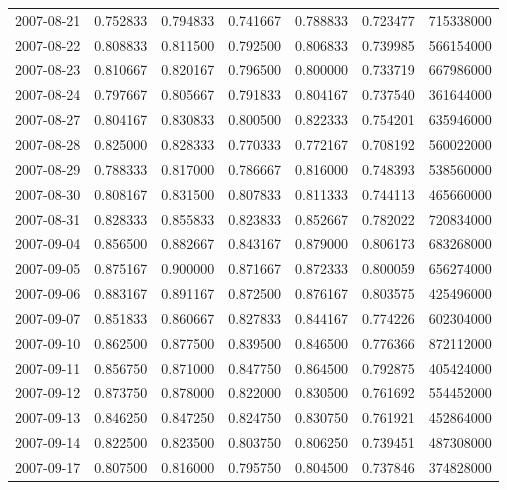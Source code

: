 \begin{tabular}{lrrrrrr}
2007-08-21 &    0.752833 &    0.794833 &    0.741667 &    0.788833 &    0.723477 &   715338000 \\
2007-08-22 &    0.808833 &    0.811500 &    0.792500 &    0.806833 &    0.739985 &   566154000 \\
2007-08-23 &    0.810667 &    0.820167 &    0.796500 &    0.800000 &    0.733719 &   667986000 \\
2007-08-24 &    0.797667 &    0.805667 &    0.791833 &    0.804167 &    0.737540 &   361644000 \\
2007-08-27 &    0.804167 &    0.830833 &    0.800500 &    0.822333 &    0.754201 &   635946000 \\
2007-08-28 &    0.825000 &    0.828333 &    0.770333 &    0.772167 &    0.708192 &   560022000 \\
2007-08-29 &    0.788333 &    0.817000 &    0.786667 &    0.816000 &    0.748393 &   538560000 \\
2007-08-30 &    0.808167 &    0.831500 &    0.807833 &    0.811333 &    0.744113 &   465660000 \\
2007-08-31 &    0.828333 &    0.855833 &    0.823833 &    0.852667 &    0.782022 &   720834000 \\
2007-09-04 &    0.856500 &    0.882667 &    0.843167 &    0.879000 &    0.806173 &   683268000 \\
2007-09-05 &    0.875167 &    0.900000 &    0.871667 &    0.872333 &    0.800059 &   656274000 \\
2007-09-06 &    0.883167 &    0.891167 &    0.872500 &    0.876167 &    0.803575 &   425496000 \\
2007-09-07 &    0.851833 &    0.860667 &    0.827833 &    0.844167 &    0.774226 &   602304000 \\
2007-09-10 &    0.862500 &    0.877500 &    0.839500 &    0.846500 &    0.776366 &   872112000 \\
2007-09-11 &    0.856750 &    0.871000 &    0.847750 &    0.864500 &    0.792875 &   405424000 \\
2007-09-12 &    0.873750 &    0.878000 &    0.822000 &    0.830500 &    0.761692 &   554452000 \\
2007-09-13 &    0.846250 &    0.847250 &    0.824750 &    0.830750 &    0.761921 &   452864000 \\
2007-09-14 &    0.822500 &    0.823500 &    0.803750 &    0.806250 &    0.739451 &   487308000 \\
2007-09-17 &    0.807500 &    0.816000 &    0.795750 &    0.804500 &    0.737846 &   374828000 \\

\end{tabular}
